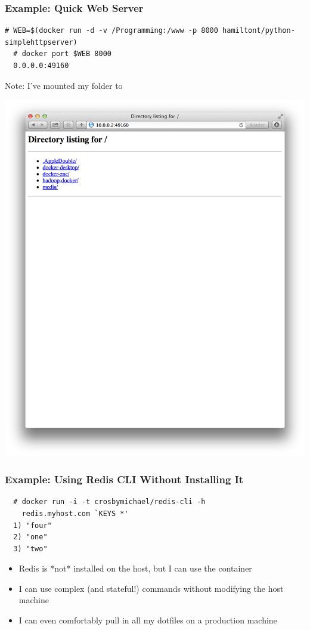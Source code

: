 \documentclass[xcolor=dvipsnames]{beamer}
\begin{document}
\begin{frame}[fragile]
  \frametitle{Example: Quick Web Server}
  \begin{lstlisting}[basicstyle=\tiny]
  # WEB=$(docker run -d -v /Programming:/www -p 8000 hamiltont/python-simplehttpserver)
  # docker port $WEB 8000
  0.0.0.0:49160
  \end{lstlisting}

  Note: I've mounted my  folder to  
  
  \includegraphics[width=\textwidth]{figures/python-webserver.png}
\end{frame}

\begin{frame}[fragile]
  \frametitle{Example: Using Redis CLI Without Installing It}
  \begin{lstlisting}
  # docker run -i -t crosbymichael/redis-cli -h 
    redis.myhost.com `KEYS *'
  1) "four"
  2) "one"
  3) "two"
  \end{lstlisting}

  \begin{itemize}
    \item Redis is *not* installed on the host, but I can use the container

    \item I can use complex (and stateful!) commands without modifying the 
    host machine

    \item I can even comfortably pull in all my dotfiles on a production machine
  \end{itemize}

\end{frame}
\end{document}
